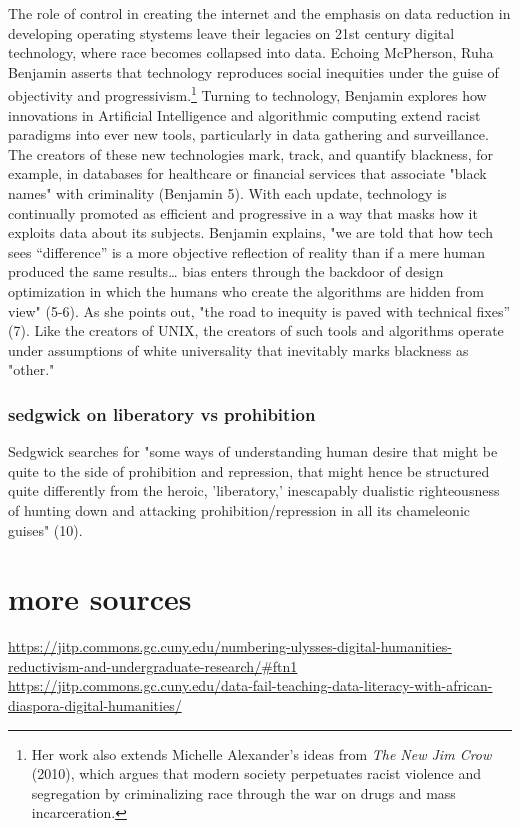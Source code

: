 \documentclass[11pt]{article}
\begin{document}
The role of control in creating the internet and the emphasis on data
reduction in developing operating stystems leave their legacies on
21st century digital technology, where race becomes collapsed into
data. Echoing McPherson, Ruha Benjamin asserts that technology
reproduces social inequities under the guise of objectivity and
progressivism.\footnote{Her work also extends Michelle Alexander's ideas from \emph{The New
Jim Crow} (2010), which argues that modern society perpetuates racist
violence and segregation by criminalizing race through the war on
drugs and mass incarceration.} Turning to technology, Benjamin explores how
innovations in Artificial Intelligence and algorithmic computing
extend racist paradigms into ever new tools, particularly in data
gathering and surveillance. The creators of these new technologies
mark, track, and quantify blackness, for example, in databases for
healthcare or financial services that associate "black names" with
criminality (Benjamin 5). With each update, technology is continually
promoted as efficient and progressive in a way that masks how it
exploits data about its subjects. Benjamin explains, "we are told that
how tech sees “difference” is a more objective reflection of reality
than if a mere human produced the same results\ldots{} bias enters through
the backdoor of design optimization in which the humans who create the
algorithms are hidden from view" (5-6). As she points out, "the road
to inequity is paved with technical fixes” (7). Like the creators of
UNIX, the creators of such tools and algorithms operate under
assumptions of white universality that inevitably marks blackness as
"other."

\subsubsection{sedgwick on liberatory vs prohibition}
\label{sec:org11c3faa}
Sedgwick searches for "some ways of understanding human desire that might
be quite to the side of prohibition and repression, that might hence
be structured quite differently from the heroic, 'liberatory,'
inescapably dualistic righteousness of hunting down and attacking
prohibition/repression in all its chameleonic guises" (10).


\section{more sources}
\label{sec:orge8413dd}
\url{https://jitp.commons.gc.cuny.edu/numbering-ulysses-digital-humanities-reductivism-and-undergraduate-research/\#ftn1}
\url{https://jitp.commons.gc.cuny.edu/data-fail-teaching-data-literacy-with-african-diaspora-digital-humanities/}
\end{document}
